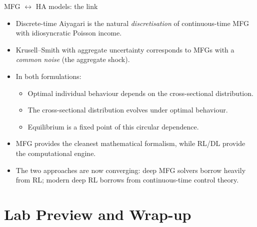 \begin{frame}{MFG $\leftrightarrow$ HA models: the link}
\begin{itemize}
\item Discrete-time Aiyagari is the natural \emph{discretisation} of continuous-time MFG with idiosyncratic Poisson income.
\medskip
\item Krusell--Smith with aggregate uncertainty corresponds to MFGs with a \emph{common noise} (the aggregate shock).
\medskip
\item In both formulations:
  \begin{itemize}
  \item Optimal individual behaviour depends on the cross-sectional distribution.
  \item The cross-sectional distribution evolves under optimal behaviour.
  \item Equilibrium is a fixed point of this circular dependence.
  \end{itemize}
\medskip
\item MFG provides the cleanest mathematical formalism, while RL/DL provide the computational engine.
\medskip
\item The two approaches are now converging: deep MFG solvers borrow heavily from RL; modern deep RL borrows from continuous-time control theory.
\end{itemize}
\end{frame}

\section{Lab Preview and Wrap-up}

